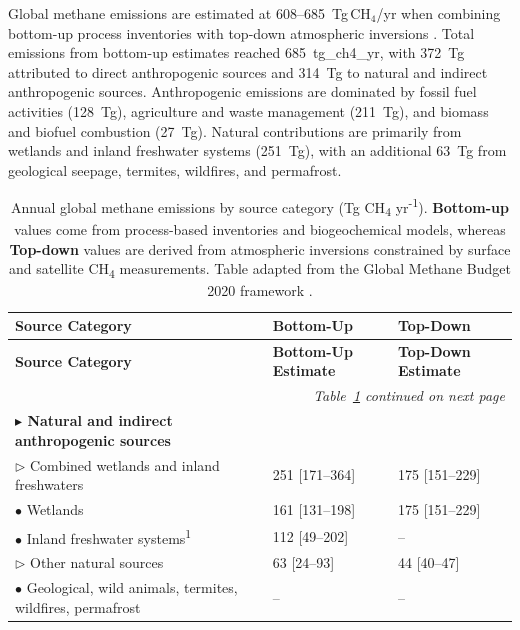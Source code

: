 Global methane emissions are estimated at 608--685~Tg\,CH$_4$/yr when combining bottom-up process inventories with top-down atmospheric inversions \cite{global_methane_budget}. Total emissions from bottom-up estimates reached 685~\gls{tg_ch4_yr}, with 372~Tg attributed to direct anthropogenic sources and 314~Tg to natural and indirect anthropogenic sources. Anthropogenic emissions are dominated by fossil fuel activities (128~Tg), agriculture and waste management (211~Tg), and biomass and biofuel combustion (27~Tg). Natural contributions are primarily from wetlands and inland freshwater systems (251~Tg), with an additional 63~Tg from geological seepage, termites, wildfires, and permafrost.

\begin{longtable}{@{} p{8cm} p{3cm} p{3cm} @{} }
\caption{Annual global methane emissions by source category (Tg CH\textsubscript{4} yr\textsuperscript{-1}). \textbf{Bottom-up} values come from process-based inventories and biogeochemical models, whereas \textbf{Top-down} values are derived from atmospheric inversions constrained by surface and satellite CH\textsubscript{4} measurements. Table adapted from the Global Methane Budget 2020 framework \cite{global_methane_budget}.}
\label{tab:methane_emissions_2020} \\
\toprule
\textbf{Source Category} & \textbf{Bottom-Up} & \textbf{Top-Down} \\
\midrule
\endfirsthead
\toprule
\textbf{Source Category} & \textbf{Bottom-Up Estimate} & \textbf{Top-Down Estimate} \\
\midrule
\endhead
\midrule
\multicolumn{3}{r}{\small\textit{Table~\ref{tab:methane_emissions_2020} continued on next page}} \\
\midrule
\endfoot
\bottomrule
\endlastfoot
\textbf{$\blacktriangleright$ Natural and indirect anthropogenic sources} & & \\
$\triangleright$ Combined wetlands and inland freshwaters & 251 [171--364] & 175 [151--229] \\
\hspace{2em}$\bullet$ Wetlands & 161 [131--198] & 175 [151--229] \\
\hspace{2em}$\bullet$ Inland freshwater systems\textsuperscript{1} & 112 [49--202] & -- \\
$\triangleright$ Other natural sources & 63 [24--93] & 44 [40--47] \\
\hspace{2em}$\bullet$ Geological, wild animals, termites, wildfires, permafrost & -- & -- \\

\end{longtable}
